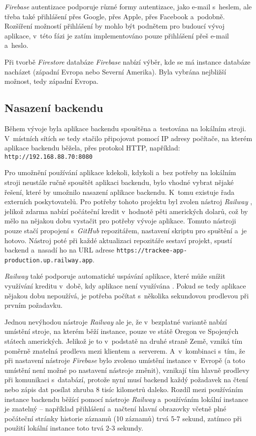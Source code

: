 \emph{Firebase} autentizace podporuje různé formy autentizace, jako e-mail s~heslem, ale třeba také přihlášení přes Google, přes Apple, přes Facebook a~podobně. Rozšíření možností přihlášení by mohlo být podnětem pro budoucí vývoj aplikace, v~této fázi je zatím implementováno pouze přihlášení přeš e-mail a~heslo. 

Při tvorbě \emph{Firestore} databáze \emph{Firebase} nabízí výběr, kde se má instance databáze nacházet (západní Evropa nebo Severní Amerika). Byla vybrána nejbližší možnost, tedy západní Evropa.

\subsection{Nasazení backendu}\label{backend-deployment}

Během vývoje byla aplikace backendu spouštěna a~testována na lokálním stroji. V~místních sítích se tedy stačilo připojovat pomocí IP adresy počítače, na kterém aplikace backendu běžela, přes protokol HTTP, například: \texttt{http://192.168.88.70:8080}

Pro umožnění používání aplikace kdekoli, kdykoli a~bez potřeby na lokálním stroji neustále ručně spouštět aplikaci backendu, bylo vhodné vybrat nějaké řešení, které by umožnilo nasazení aplikace backendu. K~tomu existuje řada externích poskytovatelů. Pro potřeby tohoto projektu byl zvolen nástroj \emph{Railway} \cite{railway}, jelikož zdarma nabízí počáteční kredit v~hodnotě pěti amerických dolarů, což by mělo na nějakou dobu vystačit pro potřeby vývoje aplikace. Tomuto nástroji pouze stačí propojení s~\emph{GitHub} repozitářem, nastavení skriptu pro spuštění a~je hotovo. Nástroj poté při každé aktualizaci repozitáře sestaví projekt, spustí backend a~nasadí ho na URL adrese \texttt{https://trackee-app-production.up.railway.app}. 

\emph{Railway} také podporuje automatické uspávání aplikace, které může snížit využívání kreditu v~době, kdy aplikace není využívána \cite{railway-app-sleeping}. Pokud se tedy aplikace nějakou dobu nepoužívá, je potřeba počítat s~několika sekundovou prodlevou při prvním požadavku.

Jednou nevýhodou nástroje \emph{Railway} ale je, že v~bezplatné variantě nabízí umístění stroje, na kterém běží instance, pouze ve státě Oregon ve Spojených státech amerických. Jelikož je to v~podstatě na druhé straně Země, vzniká tím poměrně znatelná prodleva mezi klientem a~serverem. A~v~kombinaci s~tím, že při nastavení nástroje \emph{Firebase} bylo zvoleno umístění instance v~Evropě (a toto umístění není možné po nastavení nástroje změnit), vznikají tím hlavně prodlevy při komunikaci s~databází, protože nyní musí backend každý požadavek na čtení nebo zápis dat posílat zhruba 8 tisíc kilometrů daleko. Rozdíl mezi používáním instance backendu běžící pomocí nástroje \emph{Railway} a~používáním lokální instance je znatelný – například přihlášení a~načtení hlavní obrazovky včetně plné počáteční stránky historie záznamů (10 záznamů) trvá 5-7 sekund, zatímco při použití lokální instance toto trvá 2-3 sekundy.

